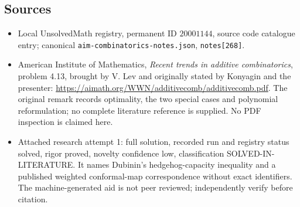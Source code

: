 \documentclass[11pt]{article}
\begin{document}
\subsection{Sources}
\begin{itemize}
\item Local UnsolvedMath registry, permanent ID $20001144$, source code catalogue entry; canonical \texttt{aim-combinatorics-notes.json}, \texttt{notes[268]}.
\item American Institute of Mathematics, \emph{Recent trends in additive combinatorics}, problem 4.13, brought by V. Lev and originally stated by Konyagin and the presenter: \url{https://aimath.org/WWN/additivecomb/additivecomb.pdf}. The original remark records optimality, the two special cases and polynomial reformulation; no complete literature reference is supplied. No PDF inspection is claimed here.
\item Attached research attempt 1: full solution, recorded run and registry status solved, rigor proved, novelty confidence low, classification SOLVED-IN-LITERATURE. It names Dubinin's hedgehog-capacity inequality and a published weighted conformal-map correspondence without exact identifiers. The machine-generated aid is not peer reviewed; independently verify before citation.
\end{itemize}
\end{document}

